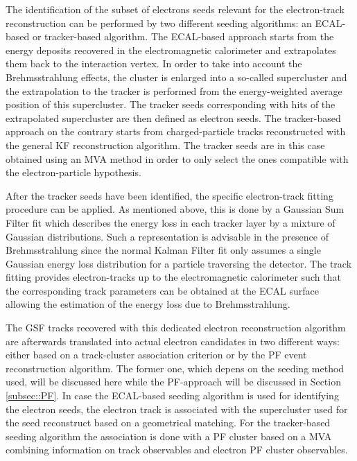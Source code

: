 The identification of the subset of electrons seeds relevant for the electron-track reconstruction can be performed by two different seeding algorithms: an ECAL-based or tracker-based algorithm.
The ECAL-based approach starts from the energy deposits recovered in the electromagnetic calorimeter and extrapolates them back to the interaction vertex. In order to take into account the Brehmsstrahlung effects, the cluster is enlarged into a so-called supercluster and the extrapolation to the tracker is performed from the energy-weighted average position of this supercluster. The tracker seeds corresponding with hits of the extrapolated supercluster are then defined as electron seeds. The tracker-based approach on the contrary starts from charged-particle tracks reconstructed with the general KF reconstruction algorithm. The tracker seeds are in this case obtained using an MVA method in order to only select the ones compatible with the electron-particle hypothesis.

After the tracker seeds have been identified, the specific electron-track fitting procedure can be applied. As mentioned above, this is done by a Gaussian Sum Filter fit which describes the energy loss in each tracker layer by a mixture of Gaussian distributions. Such a representation is advisable in the presence of Brehmsstrahlung since the normal Kalman Filter fit only assumes a single Gaussian energy loss distribution for a particle traversing the detector. The track fitting provides electron-tracks up to the electromagnetic calorimeter such that the corresponding track parameters can be obtained at the ECAL surface allowing the estimation of the energy loss due to Brehmsstrahlung.

The GSF tracks recovered with this dedicated electron reconstruction algorithm are afterwards translated into actual electron candidates in two different ways: either based on a track-cluster association criterion or by the PF event reconstruction algorithm. The former one, which depens on the seeding method used, will be discussed here while the PF-approach will be discussed in Section \ref{subsec::PF}.
In case the ECAL-based seeding algorithm is used for identifying the electron seeds, the electron track is associated with the supercluster used for the seed reconstruct based on a geometrical matching. For the tracker-based seeding algorithm the association is done with a PF cluster based on a MVA combining information on track observables and electron PF cluster observables. %

